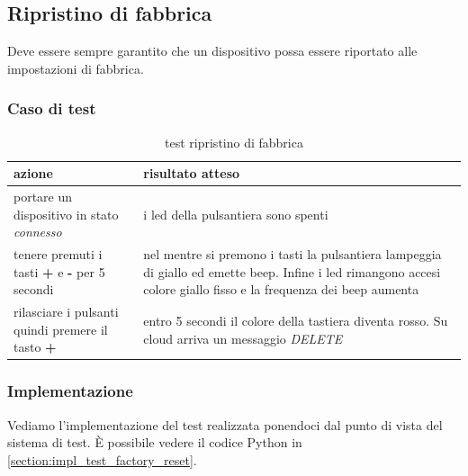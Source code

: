 \documentclass[12pt,a4paper,twoside,titlepage]{book}
\begin{document}
\subsection{Ripristino di fabbrica}
\label{section:test_factory_reset}

Deve essere sempre garantito che un dispositivo possa essere riportato alle impostazioni di fabbrica.

\subsubsection{Caso di test}

\begin{table}
    \centering
    \begin{tabular}{| p{} | p{} |}
        \hline \textbf{azione} & \textbf{risultato atteso} \\
        \hline portare un dispositivo in stato \textit{connesso} & i \acrshort{led} della pulsantiera sono spenti \\
        \hline tenere premuti i tasti \textbf{+} e \textbf{-} per 5 secondi & nel mentre si premono i tasti la pulsantiera lampeggia di giallo ed emette beep. Infine i \acrshort{led} rimangono accesi colore giallo fisso e la frequenza dei beep aumenta \\
        \hline rilasciare i pulsanti quindi premere il tasto \textbf{+} & entro 5 secondi il colore della tastiera diventa rosso. Su cloud arriva un messaggio \textit{DELETE} \\
        \hline
    \end{tabular}
    \caption{test ripristino di fabbrica}
\end{table}

\subsubsection{Implementazione}
Vediamo l'implementazione del test realizzata ponendoci dal punto di vista del sistema di test. 
È possibile vedere il codice Python in \autoref{section:impl_test_factory_reset}.
\end{document}
